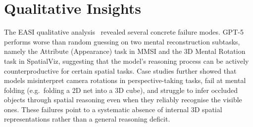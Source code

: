 \section{Qualitative Insights}

The EASI qualitative analysis~\cite{cai2025holisticevaluationmultimodalllms} revealed several concrete failure modes. GPT-5 performs worse than random guessing on two mental reconstruction subtasks, namely the Attribute (Appearance) task in MMSI and the 3D Mental Rotation task in SpatialViz, suggesting that the model's reasoning process can be actively counterproductive for certain spatial tasks. Case studies further showed that models misinterpret camera rotations in perspective-taking tasks, fail at mental folding (e.g.\ folding a 2D net into a 3D cube), and struggle to infer occluded objects through spatial reasoning even when they reliably recognise the visible ones. These failures point to a systematic absence of internal 3D spatial representations rather than a general reasoning deficit.
